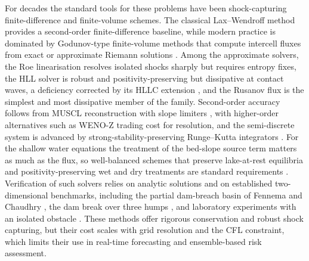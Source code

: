 \documentclass[12pt]{article}
\newenvironment{newtext}{\par\color{red}}{\par}
\begin{document}
\begin{newtext}
For decades the standard tools for these problems have been shock-capturing finite-difference and finite-volume schemes. The classical Lax--Wendroff method \cite{lax1960systems} provides a second-order finite-difference baseline, while modern practice is dominated by Godunov-type finite-volume methods that compute intercell fluxes from exact or approximate Riemann solutions \cite{godunov1959difference,toro2009riemann}. Among the approximate solvers, the Roe linearisation \cite{roe1981approximate} resolves isolated shocks sharply but requires entropy fixes, the HLL solver \cite{harten1983upstream} is robust and positivity-preserving but dissipative at contact waves, a deficiency corrected by its HLLC extension \cite{toro1994hllc}, and the Rusanov flux \cite{rusanov1961calculation} is the simplest and most dissipative member of the family. Second-order accuracy follows from MUSCL reconstruction with slope limiters \cite{vanleer1979towards}, with higher-order alternatives such as WENO-Z \cite{borges2008improved} trading cost for resolution, and the semi-discrete system is advanced by strong-stability-preserving Runge--Kutta integrators \cite{gottlieb2001strong}. For the shallow water equations the treatment of the bed-slope source term matters as much as the flux, so well-balanced schemes that preserve lake-at-rest equilibria \cite{bermudez1994upwind,audusse2004fast} and positivity-preserving wet and dry treatments \cite{xing2010positivity} are standard requirements \cite{kurganov2018finite}. Verification of such solvers relies on analytic solutions \cite{stoker1957water,delestre2013swashes} and on established two-dimensional benchmarks, including the partial dam-breach basin of Fennema and Chaudhry \cite{fennema1990explicit}, the dam break over three humps \cite{kawahara1986finite}, and laboratory experiments with an isolated obstacle \cite{soaresfrazao2007experimental}. These methods offer rigorous conservation and robust shock capturing, but their cost scales with grid resolution and the CFL constraint, which limits their use in real-time forecasting and ensemble-based risk assessment.


\end{newtext}
\end{document}

